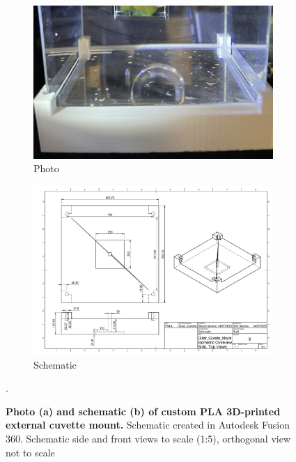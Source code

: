 \begin{figure}[H]
    \centering
    \begin{subfigure}[a]{1\textwidth}
    \includegraphics[width=1\linewidth]{Figures/ExternalCuvetteMount.jpg}
    \caption{Photo}
    
    \end{subfigure}
   
    \begin{subfigure}[b]{1\textwidth}
    \includegraphics[width=1\linewidth]{Figures/Outer_Cuvette_Mount Drawing v1.pdf}
    \caption{Schematic}
    \end{subfigure}
    \caption{\textbf{Photo (a) and schematic (b) of custom PLA 3D-printed external cuvette mount.} Schematic created in Autodesk Fusion 360. Schematic side and front views to scale (1:5), orthogonal view not to scale}.
    \label{fig:enter-label}
\end{figure}

